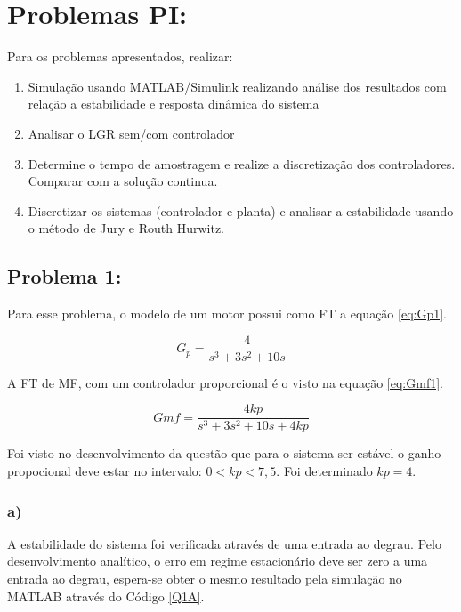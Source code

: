 \section*{Problemas PI:}

Para os problemas apresentados, realizar:
\begin{enumerate}[label=\alph*)]
    \item Simulação usando MATLAB/Simulink realizando análise dos resultados com relação a estabilidade e 
    resposta dinâmica do sistema
    \item Analisar o LGR sem/com controlador
    \item Determine o tempo de amostragem e realize a discretização dos controladores. Comparar com a
    solução continua.
    \item Discretizar os sistemas (controlador e planta) e analisar a estabilidade usando o método de Jury e
    Routh Hurwitz.
\end{enumerate}
    

\subsection*{Problema 1:}

Para esse problema, o modelo de um motor possui como FT a equação \ref{eq:Gp1}. 

\begin{equation}
    G_p = \frac{4}{s^3+3s^2+10s}
    \label{eq:Gp1}
\end{equation}

A FT de MF, com um controlador proporcional é o visto na equação \ref{eq:Gmf1}.

\begin{equation}
    Gmf = \frac{4kp}{s^3+3s^2+10s + 4kp}
    \label{eq:Gmf1}
\end{equation}

Foi visto no desenvolvimento da questão que para o sistema ser estável o ganho propocional deve estar
no intervalo: $0<kp<7,5$. Foi determinado $kp = 4$.


\subsubsection*{a)}
    A estabilidade do sistema foi verificada através de uma entrada ao degrau. Pelo desenvolvimento analítico,
    o erro em regime estacionário deve ser zero a uma entrada ao degrau, espera-se obter o mesmo resultado
    pela simulação no MATLAB através do Código \ref{Q1A}.

